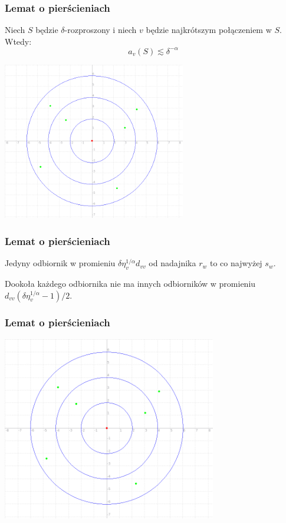 \documentclass[polish, t,10pt]{beamer}
\begin{document}
\begin{frame}
    \frametitle{Lemat o pierścieniach}
    \begin{lemma}
        Niech $S$ będzie $\delta$-rozproszony i niech $v$ będzie najkrótszym połączeniem w $S$. Wtedy:
        \begin{equation*}
            a_v(S) \lesssim \delta^{-\alpha}
        \end{equation*}
    \end{lemma}
    \centering
    \includegraphics[width=0.6\textwidth]{pictures/rings.png}
\end{frame}

\begin{frame}
    \frametitle{Lemat o pierścieniach}
    \begin{lemma}
        Jedyny odbiornik w promieniu $\delta \eta_v^{1/\alpha} d_{vv}$ od nadajnika $r_w$ to
        co najwyżej $s_w$.
    \end{lemma}
    \pause
    \begin{lemma}
        Dookoła każdego odbiornika nie ma innych odbiorników w promieniu $d_{vv}(\delta\eta_v^{1/\alpha} - 1)/2$.
    \end{lemma}
\end{frame}

\begin{frame}
    \frametitle{Lemat o pierścieniach}
    \centering
    \includegraphics[width=0.7\textwidth]{pictures/rings.png}
\end{frame}
\end{document}

